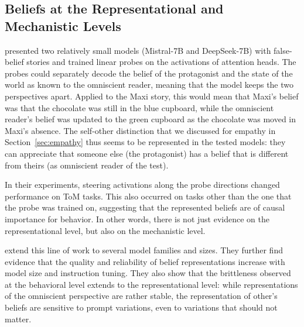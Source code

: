 \subsection{Beliefs at the Representational and Mechanistic Levels}
\citet{zhu2024language} presented two relatively small models (Mistral-7B and DeepSeek-7B) with false-belief stories and trained linear probes on the activations of attention heads. The probes could separately decode the belief of the protagonist and the state of the world as known to the omniscient reader, meaning that the model keeps the two perspectives apart. Applied to the Maxi story, this would mean that Maxi's belief was that the chocolate was still in the blue cupboard, while the omniscient reader's belief was updated to the green cupboard as the chocolate was moved in Maxi's absence. The self-other distinction that we discussed for empathy in Section~\ref{sec:empathy} thus seems to be represented in the tested models: they can appreciate that someone else (the protagonist) has a belief that is different from theirs (as omniscient reader of the test). 

In their experiments, steering activations along the probe directions changed performance on ToM tasks. This also occurred on tasks other than the one that the probe was trained on, suggesting that the represented beliefs are of causal importance for behavior. In other words, there is not just evidence on the representational level, but also on the mechanistic level. 

\citet{bortoletto2024benchmarking} extend this line of work to several model families and sizes. They further find evidence that the quality and reliability of belief representations increase with model size and instruction tuning. They also show that the brittleness observed at the behavioral level extends to the representational level: while representations of the omniscient perspective are rather stable, the representation of other's beliefs are sensitive to prompt variations, even to variations that should not matter.

